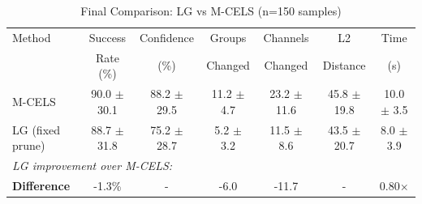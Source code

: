 \begin{table}[ht]
\centering
\caption{Final Comparison: LG vs M-CELS (n=150 samples)}
\label{tab:ablation_lg_vs_mcels}
\begin{tabular}{lcccccc}
\hline
Method & Success & Confidence & Groups & Channels & L2 & Time \\
       & Rate (\%) & (\%) & Changed & Changed & Distance & (s) \\
\hline
M-CELS & 90.0 $\pm$ 30.1 & 88.2 $\pm$ 29.5 & 11.2 $\pm$ 4.7 & 23.2 $\pm$ 11.6 & 45.8 $\pm$ 19.8 & 10.0 $\pm$ 3.5 \\
LG (fixed prune) & 88.7 $\pm$ 31.8 & 75.2 $\pm$ 28.7 & 5.2 $\pm$ 3.2 & 11.5 $\pm$ 8.6 & 43.5 $\pm$ 20.7 & 8.0 $\pm$ 3.9 \\
\hline
\multicolumn{7}{l}{\textit{LG improvement over M-CELS:}} \\
\textbf{Difference} & -1.3\% & - & -6.0 & -11.7 & - & 0.80$\times$ \\
\hline
\end{tabular}
\end{table}